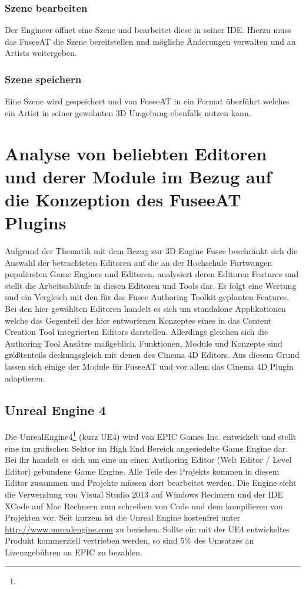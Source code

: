 \documentclass[pagesize, paper=a4, fontsize=12pt, titlepage=true, headings=small, headnosepline, abstractoff, liststotoc, nochapterprefix, plainheadsepline, twoside]{scrreprt}
\begin{document}
\subsubsection{Szene bearbeiten}
Der Engineer öffnet eine Szene und bearbeitet diese in seiner IDE. Hierzu muss das FuseeAT die Szene bereitstellen und mögliche Änderungen verwalten und an Artists weitergeben.

\subsubsection{Szene speichern}
Eine Szene wird gespeichert und von FuseeAT in ein Format überführt welches ein Artist in seiner gewohnten 3D Umgebung ebenfalls nutzen kann.

\section{Analyse von beliebten Editoren und derer Module im Bezug auf die Konzeption des FuseeAT Plugins}
Aufgrund der Thematik mit dem Bezug zur 3D Engine Fusee beschränkt sich die Auswahl der betrachteten Editoren auf die an der Hochschule Furtwangen populärsten Game Engines und Editoren, analysiert deren Editoren Features und stellt die Arbeitsabläufe in diesen Editoren und Tools dar. Es folgt eine Wertung und ein Vergleich mit den für das Fusee Authoring Toolkit geplanten Features. Bei den hier gewählten Editoren handelt es sich um standalone Applikationen welche das Gegenteil des hier entworfenen Konzeptes eines in das Content Creation Tool integrierten Editors darstellen. Allerdings gleichen sich die Authoring Tool Ansätze maßgeblich. Funktionen, Module und Konzepte sind größtenteils deckungsgleich mit denen des Cinema 4D Editors. Aus diesem Grund lassen sich einige der Module für FuseeAT und vor allem das Cinema 4D Plugin adaptieren.

\subsection{Unreal Engine 4}
Die UnrealEngine4\footnote{} (kurz UE4) wird von EPIC Games Inc. entwickelt und stellt eine im grafischen Sektor im High End Bereich angesiedelte Game Engine dar. Bei ihr handelt es sich um eine an einen Authoring Editor (Welt Editor / Level Editor) gebundene Game Engine. Alle Teile des Projekts kommen in diesem Editor zusammen und Projekte müssen dort bearbeitet werden. Die Engine sieht die Verwendung von Visual Studio 2013 auf Windows Rechnern und der IDE XCode auf Mac Rechnern zum schreiben von Code und dem kompilieren von Projekten vor. Seit kurzem ist die Unreal Engine kostenfrei unter \url{http://www.unrealengine.com} zu beziehen. Sollte ein mit der UE4 entwickeltes Produkt kommerziell vertrieben werden, so sind 5\% des Umsatzes an Lizenzgebühren an EPIC zu bezahlen.
\end{document}
